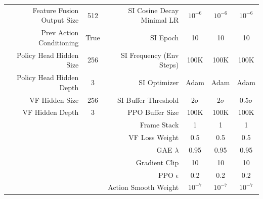\begin{table}[t!]
{\begin{tabular}{rrll|rccc}
Feature Fusion Output Size      & \multicolumn{3}{c|}{512}  & SI Cosine Decay Minimal LR  & \multicolumn{1}{c|}{$10^{-6}$}          & \multicolumn{1}{c|}{$10^{-6}$}          & $10^{-6}$          \\
Prev Action Conditioning        & \multicolumn{3}{c|}{True} & SI Epoch                    & \multicolumn{1}{c|}{10}                 & \multicolumn{1}{c|}{10}                 & 10                 \\
Policy Head Hidden Size         & \multicolumn{3}{c|}{256}  & SI Frequency (Env Steps)    & \multicolumn{1}{c|}{100K}               & \multicolumn{1}{c|}{100K}               & 100K               \\
Policy Head Hidden Depth        & \multicolumn{3}{c|}{3}    & SI Optimizer                & \multicolumn{1}{c|}{Adam}               & \multicolumn{1}{c|}{Adam}               & Adam               \\
VF Hidden Size        & \multicolumn{3}{c|}{256}  & SI Buffer Threshold         & \multicolumn{1}{c|}{$2 \sigma$}         & \multicolumn{1}{c|}{$2 \sigma$}         & $0.5 \sigma$       \\
VF Hidden Depth        & \multicolumn{3}{c|}{3}    & PPO Buffer Size             & \multicolumn{1}{c|}{100K}               & \multicolumn{1}{c|}{100K}               & 100K               \\
                                & \multicolumn{3}{c|}{}     & Frame Stack                 & \multicolumn{1}{c|}{1}                  & \multicolumn{1}{c|}{1}                  & 1                  \\
                                & \multicolumn{3}{c|}{}     & VF Loss Weight              & \multicolumn{1}{c|}{0.5}                & \multicolumn{1}{c|}{0.5}                & 0.5                \\
                                & \multicolumn{3}{c|}{}     & GAE $\lambda$               & \multicolumn{1}{c|}{0.95}               & \multicolumn{1}{c|}{0.95}               & 0.95               \\
                                & \multicolumn{3}{c|}{}     & Gradient Clip               & \multicolumn{1}{c|}{10}                 & \multicolumn{1}{c|}{10}                 & 10                 \\
                                & \multicolumn{3}{c|}{}     & PPO $\epsilon$              & \multicolumn{1}{c|}{0.2}                & \multicolumn{1}{c|}{0.2}                & 0.2                \\
                                & \multicolumn{3}{c|}{}     & Action Smooth Weight        & \multicolumn{1}{c|}{$10^{-7}$}          & \multicolumn{1}{c|}{$10^{-7}$}          & $10^{-7}$          \\

\end{tabular}}
\end{table}
